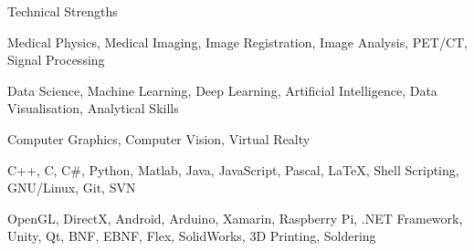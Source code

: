 \documentclass{cv}
\begin{document}
    \begin{rSection}{Technical Strengths}
        \item Medical Physics, Medical Imaging, Image Registration, Image Analysis, PET/CT, Signal Processing
        \item Data Science, Machine Learning, Deep Learning, Artificial Intelligence, Data Visualisation, Analytical Skills
        \item Computer Graphics, Computer Vision, Virtual Realty
        \item C++, C, C\#, Python, Matlab, Java, JavaScript, Pascal, LaTeX, Shell Scripting, GNU/Linux, Git, SVN
        \item OpenGL, DirectX, Android, Arduino, Xamarin, Raspberry Pi, .NET Framework, Unity, Qt, BNF, EBNF, Flex, SolidWorks, 3D Printing, Soldering 
    \end{rSection}
    
\end{document}
